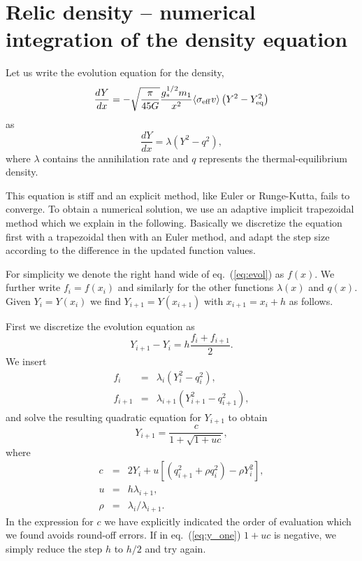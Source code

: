 
\section{Relic density -- numerical integration of the density equation}
\label{sec:numdens}

Let us write the evolution equation for the density,
\begin{equation} \label{eq:Boltzmann4}
  \frac{dY}{dx} = - \sqrt{\frac{\pi}{45G}} \frac{g_{*}^{1/2}m_1}{x^2}
  \langle \sigma_{\rm{eff}} v \rangle \left( Y^2 -
  Y_{\rm{eq}}^2 \right) 
\end{equation}
as
\begin{equation} 
  \frac{dY}{dx} = \lambda (Y^2 - q^2),
  \label{eq:evol}
\end{equation}
where $\lambda$ contains the annihilation rate and $q$ represents the
thermal-equilibrium density.

This equation is stiff and an explicit method, like Euler or Runge-Kutta, fails
to converge. To obtain a numerical solution, we use an adaptive implicit
trapezoidal method which we explain in the following.  Basically we discretize
the equation first with a trapezoidal then with an Euler method, and adapt the
step size according to the difference in the updated function values.

For simplicity we denote the right hand wide of eq.~(\ref{eq:evol}) as $f(x)$.
We further write $f_{i} = f(x_i)$ and similarly for the other functions
$\lambda(x)$ and $q(x)$. Given $Y_{i} = Y(x_i)$ we find $Y_{i+1} = Y(x_{i+1}) $
with $x_{i+1} = x_{i} + h$ as follows.

First we discretize the evolution equation as
\begin{equation}
  Y_{i+1} - Y_{i} = h \frac{ f_i + f_{i+1}}{2} .
\end{equation}
We insert
\begin{eqnarray}
  f_{i} &=& \lambda_{i} \left( Y_{i}^2 - q_{i}^2 \right), \\
  f_{i+1} &=& \lambda_{i+1} \left( Y_{i+1}^2 - q_{i+1}^2 \right) ,
\end{eqnarray}
and solve the resulting quadratic equation for $Y_{i+1}$ to obtain
\begin{equation}
  \label{eq:y_one}
  Y_{i+1} = \frac{c}{1+\sqrt{1+uc}} ,
\end{equation}
where
\begin{eqnarray}
c &=& 2 Y_{i} + u \left[ (q^2_{i+1} + \rho q^2_{i}) - \rho Y^2_{i} \right] , \\
u &=& h \lambda_{i+1} ,\\
\rho &=& \lambda_i / \lambda_{i+1} .
\end{eqnarray}
In the expression for $c$ we have explicitly indicated the order of evaluation
which we found avoids round-off errors. If in eq.~(\ref{eq:y_one}) $1+uc$ is
negative, we simply reduce the step $h$ to $h/2$ and try again.


